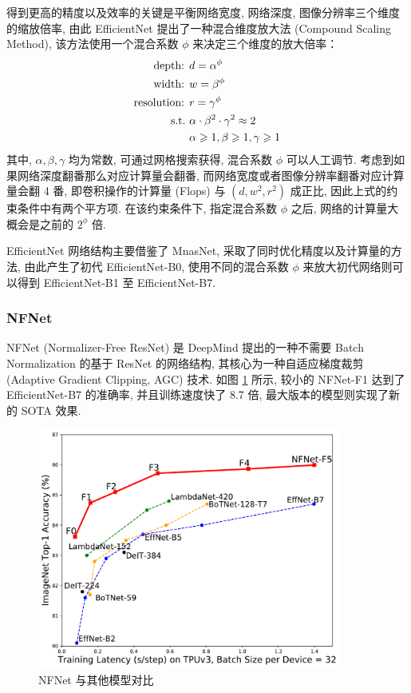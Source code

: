 \documentclass[12pt]{article}
\begin{document}
得到更高的精度以及效率的关键是平衡网络宽度, 网络深度, 图像分辨率三个维度的缩放倍率, 由此 EfficientNet 提出了一种混合维度放大法 (Compound Scaling Method), 该方法使用一个混合系数 $\phi$ 来决定三个维度的放大倍率：
\begin{equation} \label{eq:optobj} 
  \begin{aligned}
    \text{depth: } & d  = \alpha ^ \phi \\
    \text{width: } & w = \beta ^ \phi \\
    \text{resolution: } & r   =  \gamma ^ \phi  \\
    \text{s.t.}~  & \alpha \cdot \beta ^2 \cdot \gamma ^ 2 \approx 2 \\
    & \alpha \geqslant 1, \beta \geqslant 1, \gamma \geqslant 1 
  \end{aligned}
\end{equation}
其中, $\alpha,\beta,\gamma$ 均为常数, 可通过网格搜索获得, 混合系数 $\phi$ 可以人工调节. 考虑到如果网络深度翻番那么对应计算量会翻番, 而网络宽度或者图像分辨率翻番对应计算量会翻 4 番, 即卷积操作的计算量 (Flops) 与 $(d,w^2,r^2)$ 成正比, 因此上式的约束条件中有两个平方项. 在该约束条件下, 指定混合系数 $\phi$ 之后, 网络的计算量大概会是之前的 $2^\phi$ 倍. 

EfficientNet 网络结构主要借鉴了 MnasNet, 采取了同时优化精度以及计算量的方法, 由此产生了初代 EfficientNet-B0, 使用不同的混合系数 $\phi$ 来放大初代网络则可以得到 EfficientNet-B1 至 EfficientNet-B7.


\subsubsection{NFNet}



NFNet (Normalizer-Free ResNet) \cite{Brock2021High} 是 DeepMind 提出的一种不需要 Batch Normalization 的基于 ResNet 的网络结构, 其核心为一种自适应梯度裁剪 (Adaptive Gradient Clipping, AGC) 技术. 如图 \ref{fig:nfnet_pareto_front} 所示, 较小的 NFNet-F1 达到了 EfficientNet-B7 的准确率, 并且训练速度快了 8.7 倍, 最大版本的模型则实现了新的 SOTA 效果. 

\begin{figure}[htbp]
  \centering
  \includegraphics[width=10cm]{nfnet_pareto_front.pdf}
  \caption{NFNet 与其他模型对比}
  \label{fig:nfnet_pareto_front}
\end{figure}
\end{document}
